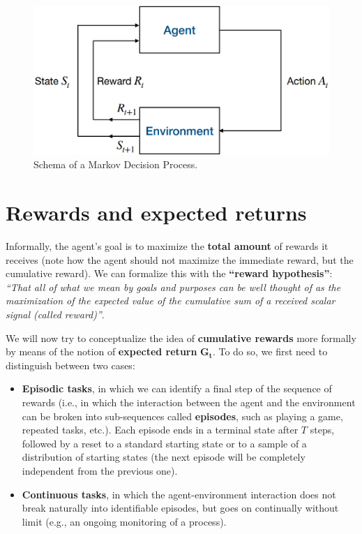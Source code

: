 \begin{figure}[hbt]
    \centering
    \includegraphics[width=\textwidth]{Images/Chapter 2/mdp.png}
    \caption{Schema of a Markov Decision Process.}
    \label{fig:ch2-mdp}
\end{figure}

\section{Rewards and expected returns}
Informally, the agent’s goal is to maximize the \textbf{total amount} of rewards it receives (note how the agent should not maximize the immediate reward, but the cumulative reward). We can formalize this with the \textbf{``reward hypothesis''}: \textit{``That all of what we mean by goals and purposes can be well thought of as the maximization of the expected value of the cumulative sum of a received scalar signal (called reward)''}.

We will now try to conceptualize the idea of \textbf{cumulative rewards} more formally by means of the notion of \textbf{expected return} $\boldsymbol{G_t}$. To do so, we first need to distinguish between two cases:

\begin{itemize}
    \item \textbf{Episodic tasks}, in which we can identify a final step of the sequence of rewards (i.e., in which the interaction between the agent and the environment can be broken into sub-sequences called \textbf{episodes}, such as playing a game, repeated tasks, etc.). Each episode ends in a terminal state after $T$ steps, followed by a reset to a standard starting state or to a sample of a distribution of starting states (the next episode will be completely independent from the previous one).
    \item \textbf{Continuous tasks}, in which the agent-environment interaction does not break naturally into identifiable episodes, but goes on continually without limit (e.g., an ongoing monitoring of a process).
\end{itemize}

